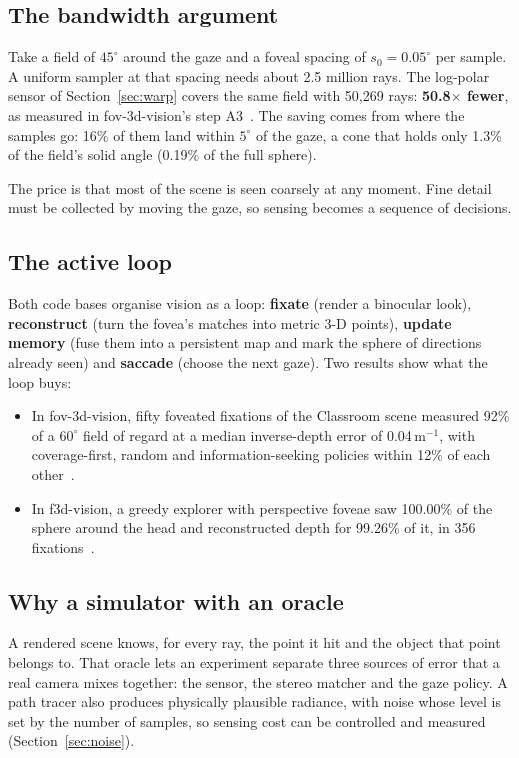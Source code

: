 \documentclass[11pt,a4paper]{article}
\begin{document}
\subsection{The bandwidth argument}

Take a field of $45^\circ$ around the gaze and a foveal spacing of $s_0 = 0.05^\circ$ per sample. A uniform
sampler at that spacing needs about 2.5 million rays. The log-polar sensor of Section~\ref{sec:warp} covers the
same field with 50{,}269 rays: \textbf{50.8$\times$ fewer}, as measured in fov-3d-vision's step
A3~\cite{fov3dA3}. The saving comes from where the samples go: 16\% of them land within $5^\circ$ of the gaze, a
cone that holds only 1.3\% of the field's solid angle (0.19\% of the full sphere).

The price is that most of the scene is seen coarsely at any moment. Fine detail must be collected by moving the
gaze, so sensing becomes a sequence of decisions.

\subsection{The active loop}

Both code bases organise vision as a loop: \textbf{fixate} (render a binocular look), \textbf{reconstruct} (turn
the fovea's matches into metric 3-D points), \textbf{update memory} (fuse them into a persistent map and mark the
sphere of directions already seen) and \textbf{saccade} (choose the next gaze). Two results show what the loop
buys:
\begin{itemize}
\item In fov-3d-vision, fifty foveated fixations of the Classroom scene measured 92\% of a $60^\circ$ field of
  regard at a median inverse-depth error of 0.04\,m$^{-1}$, with coverage-first, random and information-seeking
  policies within 12\% of each other~\cite{fov3dC}.
\item In f3d-vision, a greedy explorer with perspective foveae saw 100.00\% of the sphere around the head and
  reconstructed depth for 99.26\% of it, in 356 fixations~\cite{f3d,tr11}.
\end{itemize}

\subsection{Why a simulator with an oracle}

A rendered scene knows, for every ray, the point it hit and the object that point belongs to. That oracle lets an
experiment separate three sources of error that a real camera mixes together: the sensor, the stereo matcher and
the gaze policy. A path tracer also produces physically plausible radiance, with noise whose level is set by the
number of samples, so sensing cost can be controlled and measured (Section~\ref{sec:noise}).
\end{document}

